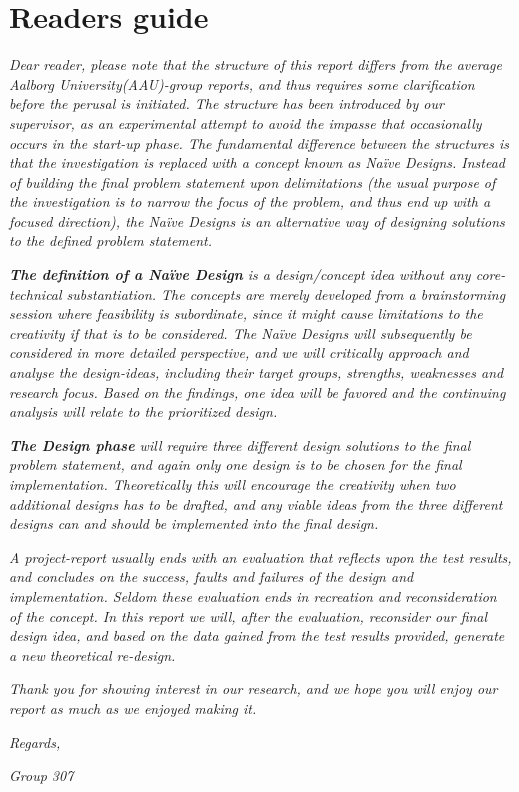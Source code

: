 \section*{Readers guide}
\textit{Dear reader, please note that the structure of this report differs from the average Aalborg University(AAU)-group reports, and thus requires some clarification before the perusal is initiated. 
The structure has been introduced by our supervisor, as an experimental attempt to avoid the impasse that occasionally occurs in the start-up phase.
The fundamental difference between the structures is that the investigation is replaced with a concept known as Naïve Designs. Instead of building the final problem statement upon delimitations (the usual purpose of the investigation is to narrow the focus of the problem, and thus end up with a focused direction), the Naïve Designs is an alternative way of designing solutions to the defined problem statement.}
\bigskip

\textit{\textbf{The definition of a Naïve Design} is a design/concept idea without any core-technical substantiation. 
The concepts are merely developed from a brainstorming session where feasibility is subordinate, since it might cause limitations to the creativity if that is to be considered.	
The Naïve Designs will subsequently be considered in more detailed perspective, and we will critically approach and analyse the design-ideas, including their target groups, strengths, weaknesses and research focus. 
Based on the findings, one idea will be favored and the continuing analysis will relate to the prioritized design.}
\bigskip

\textit{\textbf{The Design phase} will require three different design solutions to the final problem statement, and again only one design is to be chosen for the final implementation. 
Theoretically this will encourage the creativity when two additional designs has to be drafted, and any viable ideas from the three different designs can and should be implemented into the final design.}
\bigskip

\textit{A project-report usually ends with an evaluation that reflects upon the test results, and concludes on the success, faults and failures of the design and implementation. 
Seldom these evaluation ends in recreation and reconsideration of the concept. 
In this report we will, after the evaluation, reconsider our final design idea, and based on the data gained from the test results provided, generate a new theoretical re-design.}
\bigskip

\textit{Thank you for showing interest in our research, and we hope you will enjoy our report as much as we enjoyed making it.}
\bigskip

\noindent\textit{Regards,}

\noindent\textit{Group 307}